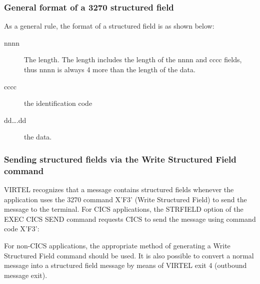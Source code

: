 \documentclass[letterpaper,10pt,english]{sphinxmanual}
\begin{document}
\subsubsection{General format of a 3270 structured field}
\label{\detokenize{User_Guide:general-format-of-a-3270-structured-field}}
As a general rule, the format of a structured field is as shown below:

\begin{sphinxVerbatim}[commandchars=\\\{\}]
\end{sphinxVerbatim}
\begin{description}
\item[{nnnn}] \leavevmode
The length. The length includes the length of the nnnn and cccc
fields, thus nnnn is always 4 more than the length of the data.

\item[{cccc}] \leavevmode
the identification code

\item[{dd….dd}] \leavevmode
the data.

\end{description}


\subsubsection{Sending structured fields via the Write Structured Field command}
\label{\detokenize{User_Guide:sending-structured-fields-via-the-write-structured-field-command}}
VIRTEL recognizes that a message contains structured fields whenever the application uses the 3270 command X’F3’
(Write Structured Field) to send the message to the terminal.
For CICS applications, the STRFIELD option of the EXEC CICS SEND command requests CICS to send the message using
command code X’F3’:

\begin{sphinxVerbatim}[commandchars=\\\{\}]
   
      
\end{sphinxVerbatim}

For non-CICS applications, the appropriate method of generating a Write Structured Field command should be used. It
is also possible to convert a normal message into a structured field message by means of VIRTEL exit 4 (outbound
message exit).
\end{document}
